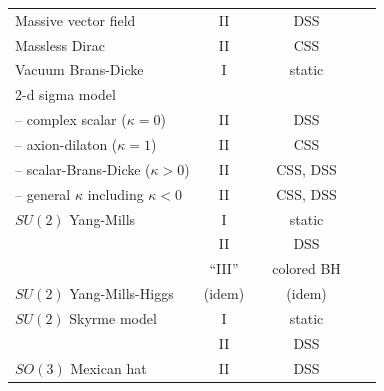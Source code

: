 \documentclass{article}
\begin{document}
\begin{table}
\begin{tabular}{| l | c | c | c | c | c |}
\hline

Massive vector field & II & \cite{GarfinkleMannVuille} &
 DSS \cite{GarfinkleMannVuille} & \cite{GarfinkleMannVuille} \\

Massless Dirac & II & \cite{VentrellaChoptuik} & CSS \cite{VentrellaChoptuik} &  \\

Vacuum Brans-Dicke & I & \cite{ChopHirschLieb} & static 
\cite{vanPutten} & 
\cite{ChopHirschLieb}\\

\hline

2-d sigma model &&&& \\

-- complex scalar ($\kappa=0$) & II & \cite{Choptuik_pc} &
DSS \cite{Gundlach_Chop2}  &
\cite{Gundlach_Chop2} \\

-- axion-dilaton ($\kappa=1$) & II & 
\cite{HamadeHorneStewart} & 
CSS \cite{EardleyHirschmannHorne,HamadeHorneStewart} & 
\cite{HamadeHorneStewart} \\

-- scalar-Brans-Dicke ($\kappa>0$) & II & \cite{LieblingChoptuik,Liebling}
& CSS, DSS & \\

-- general $\kappa$ including $\kappa<0$ & II & & CSS, DSS \cite{HE3} & \cite{HE3} \\

\hline
 
$SU(2)$ Yang-Mills & I & \cite{ChoptuikChmajBizon} &
static \cite{BartnikMcKinnon} & \cite{LavrelashviliMaison} \\

& II & \cite{ChoptuikChmajBizon} & DSS \cite{Gundlach_EYM} 
& \cite{Gundlach_EYM} \\

& ``III'' & \cite{ChoptuikHirschmannMarsa} &
colored BH \cite{Bizon0,VolkovGaltsov} &
\cite{StraumannZhou,VolkovBrodbeckLavrelashviliStraumann,BizonChmaj3} \\

$SU(2)$ Yang-Mills-Higgs & (idem) & \cite{Millward} &
(idem)  & \\

$SU(2)$ Skyrme model & I & \cite{BizonChmaj} & static \cite{BizonChmaj}
& \cite{BizonChmaj} \\

& II & \cite{BizonChmajTabor}  

& DSS \cite{BizonChmajTabor}  & \\

$SO(3)$ Mexican hat & II & \cite{Liebling2} & DSS & \\

\hline


\hline

\end{tabular}
\end{table}
\end{document}
